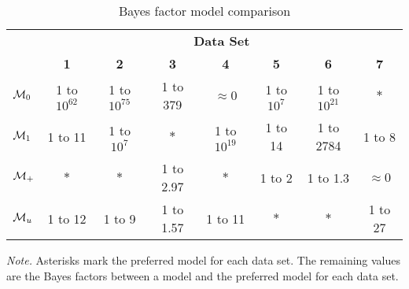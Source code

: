 \documentclass[american,man]{apa6}
\begin{document}
\begin{table}[tbp]
\begin{center}
\begin{threeparttable}
\caption{Bayes factor model comparison}
\begin{tabular}{lccccccc}
\toprule
 & \multicolumn{7}{c}{\bf{Data Set}} \\
\cmidrule(r){2-8}
 & \bf{1} & \bf{2} & \bf{3} & \bf{4} & \bf{5} & \bf{6} & \bf{7}\\
${\cal M}_0$ & 1 to $10^{62}$ & 1 to $10^{75}$ & 1 to 379 & $\approx 0$ & 1 to $10^7$ & 1 to $10^{21}$ & $*$\\
${\cal M}_1$ & 1 to 11 & 1 to $10^{7}$ & $*$ & 1 to $10^{19}$ & 1 to 14 & 1 to 2784 & 1 to 8\\
${\cal M}_+$ & $*$ & $*$ & 1 to 2.97 & $*$ & 1 to 2 & 1 to 1.3 & $\approx 0$\\
${\cal M}_u$ & 1 to 12 & 1 to 9 & 1 to 1.57 & 1 to 11 & $*$ & $*$ & 1 to 27\\
\bottomrule
\end{tabular}
\begin{tablenotes}[para]
\textit{Note.} Asterisks mark the preferred model for each data set.  The remaining values are the Bayes factors between a model and the preferred model for each data set.
\end{tablenotes}
\end{threeparttable}
\end{center}
\end{table}
\end{document}
